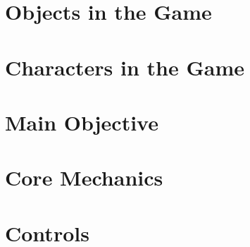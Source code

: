 \documentclass[a4paper]{scrreprt}
\begin{document}
    \section{Objects in the Game}

    \section{Characters in the Game}

    \section{Main Objective}

    \section{Core Mechanics}

    \section{Controls}
\end{document}
